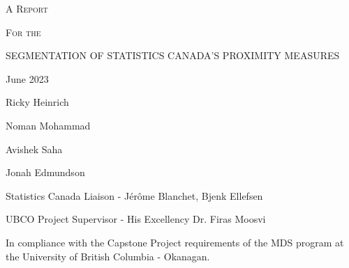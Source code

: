 \documentclass[11pt, a4paper]{article}
\begin{document}
\begin{center}
\textsc{A Report} \par
\small{\textsc{For the}} \par
\Large{\textsc{SEGMENTATION OF STATISTICS CANADA’S PROXIMITY MEASURES}}
\par
\vspace{0.917 pc} %
\par
\normalsize{ }

\thispagestyle{empty}

\vspace{8 pc} %


\par
June 2023
\par
\vspace{8pc}

Ricky Heinrich \par
Noman Mohammad \par
Avishek Saha \par
Jonah Edmundson


\par
\vfill
\thispagestyle{empty}
\par
\noindent\small{Statistics Canada Liaison - Jérôme Blanchet, Bjenk Ellefsen}
\par
\noindent\small{UBCO Project Supervisor - His Excellency Dr. Firas Moosvi}
\par
\vspace{2pc}
\par
\noindent\tiny{In compliance with the Capstone Project requirements of the MDS program at the University of British Columbia - Okanagan.}
\end{center}
\normalsize

\pagebreak



\thispagestyle{empty}
\setcounter{tocdepth}{2} %
\tableofcontents
\thispagestyle{empty}

\pagebreak
\thispagestyle{empty}
\listoffigures
\thispagestyle{empty}

\vspace{2pc}

\pagebreak
\thispagestyle{empty}
\listoftables
\pagebreak


\end{document}
